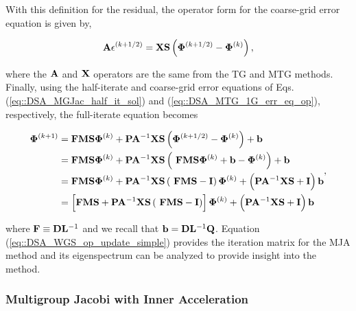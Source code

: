 \noindent With this definition for the residual, the operator form for the coarse-grid error equation is given by,

\begin{equation}
\label{eq::DSA_MTG_1G_err_eq_op}
{\bf A} \epsilon^{(k+1/2)}  =  {\bf X} {\bf S} \left(  {\bf \Phi}^{(k+1/2)} - {\bf \Phi}^{(k)}  \right),
\end{equation}

\noindent where the ${\bf A}$ and ${\bf X}$ operators are the same from the TG and MTG methods. Finally, using the half-iterate and coarse-grid error equations of Eqs. (\ref{eq::DSA_MGJac_half_it_sol}) and (\ref{eq::DSA_MTG_1G_err_eq_op}), respectively, the full-iterate equation becomes 

\begin{equation}
\label{eq::DSA_WGS_op_update_simple}
\begin{aligned}
 {\bf \Phi}^{(k+1)} &=  {\bf F}  {\bf M} {\bf S} {\bf \Phi}^{(k)} +  {\bf P} {\bf A}^{-1}  {\bf X} {\bf S} \left(  {\bf \Phi}^{(k+1/2)} - {\bf \Phi}^{(k)}  \right) + {\bf b} \\
&= {\bf F}  {\bf M} {\bf S} {\bf \Phi}^{(k)} +  {\bf P} {\bf A}^{-1}  {\bf X} {\bf S} \left(  \ {\bf F}  {\bf M} {\bf S} {\bf \Phi}^{(k)} + {\bf b} - {\bf \Phi}^{(k)}  \right) + {\bf b} \\
&= {\bf F}  {\bf M} {\bf S} {\bf \Phi}^{(k)} +  {\bf P} {\bf A}^{-1}  {\bf X} {\bf S} \left(  \ {\bf F}  {\bf M} {\bf S}  -  {\bf I} \right){\bf \Phi}^{(k)} + \left(  {\bf P} {\bf A}^{-1}  {\bf X} {\bf S}  + {\bf I} \right) {\bf b} \\
&= \left[ {\bf F}  {\bf M} {\bf S} +  {\bf P} {\bf A}^{-1}  {\bf X} {\bf S} \left(  \ {\bf F}  {\bf M} {\bf S}  -  {\bf I} \right) \right] {\bf \Phi}^{(k)} + \left(  {\bf P} {\bf A}^{-1}  {\bf X} {\bf S}  + {\bf I} \right) {\bf b}
\end{aligned} ,
\end{equation}

\noindent where ${\bf F} \equiv {\bf D}{\bf L}^{-1} $ and we recall that ${\bf b} = {\bf D}{\bf L}^{-1}  {\bf Q}$. Equation (\ref{eq::DSA_WGS_op_update_simple}) provides the iteration matrix for the MJA method and its eigenspectrum can be analyzed to provide insight into the method.

\subsubsection{Multigroup Jacobi with Inner Acceleration}
\label{sec:DSA_DSA_MG_MJIA}

